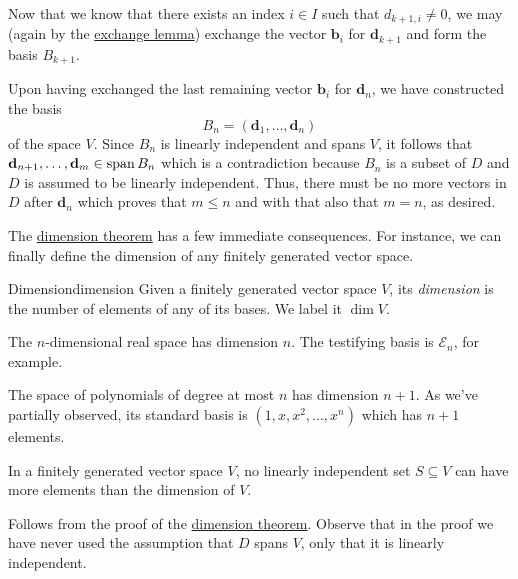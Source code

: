 \begin{thmproof}
 Now that we know that there exists an index $i \in I$ such that $d_{k+1,i} \neq
 0$, we may (again by the \hyperref[lem:exchange-lemma]{exchange lemma})
 exchange the vector $\mathbf{b}_i$ for $\mathbf{d}_{k+1}$ and form the basis
 $B_{k+1}$.

 Upon having exchanged the last remaining vector $\mathbf{b}_i$ for
 $\mathbf{d}_n$, we have constructed the basis
 \[
  B_n = (\mathbf{d}_1,\ldots,\mathbf{d}_n)
 \]
 of the space $V$. Since $B_n$ is linearly independent and spans $V$, it follows
 that $\mathbf{d}_{n+1},\ldots,\mathbf{d}_m \in \operatorname{span} B_n$ which is a
 contradiction because $B_n$ is a subset of $D$ and $D$ is assumed to be
 linearly independent. Thus, there must be no more vectors in $D$ after
 $\mathbf{d}_n$ which proves that $m \leq n$ and with that also that $m = n$, as
 desired.
\end{thmproof}

The \hyperref[thm:the-dimension-theorem]{dimension theorem} has a few immediate
consequences. For instance, we can finally define the dimension of any finitely
generated vector space.

\begin{definition}{Dimension}{dimension}
 Given a finitely generated vector space $V$, its \emph{dimension} is the number
 of elements of any of its bases. We label it $\dim V$.
\end{definition}

\begin{example}{}{}
 The $n$-dimensional real space has dimension $n$. The testifying basis is
 $\mathcal{E}_n$, for example.
\end{example}

\begin{example}{}{}
 The space of polynomials of degree at most $n$ has dimension $n + 1$. As we've
 partially observed, its standard basis is $(1,x,x^2,\ldots,x^{n})$ which has $n
 + 1$ elements.
\end{example}

\begin{corollary}{}{}
 In a finitely generated vector space $V$, no linearly independent set $S
 \subseteq V$ can have more elements than the dimension of $V$.
\end{corollary}
\begin{corproof}
 Follows from the proof of the \hyperref[thm:the-dimension-theorem]{dimension
 theorem}. Observe that in the proof we have never used the assumption that $D$
 spans $V$, only that it is linearly independent.
\end{corproof}

